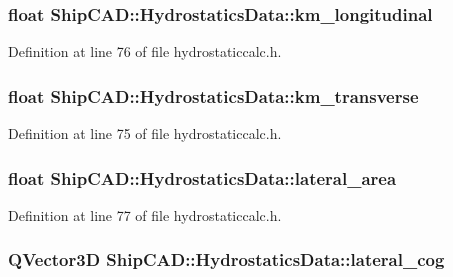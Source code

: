 \hypertarget{structShipCAD_1_1HydrostaticsData_a0a51e62f7d169fa892eaabc6a1937256}{
\subsubsection[{km\-\_\-longitudinal}]{\setlength{\rightskip}{0pt plus 5cm}float Ship\-C\-A\-D\-::\-Hydrostatics\-Data\-::km\-\_\-longitudinal}}\label{structShipCAD_1_1HydrostaticsData_a0a51e62f7d169fa892eaabc6a1937256}


Definition at line 76 of file hydrostaticcalc.\-h.

\hypertarget{structShipCAD_1_1HydrostaticsData_adbadaf4eafa63f1f10778f4c3e1f61a4}{
\subsubsection[{km\-\_\-transverse}]{\setlength{\rightskip}{0pt plus 5cm}float Ship\-C\-A\-D\-::\-Hydrostatics\-Data\-::km\-\_\-transverse}}\label{structShipCAD_1_1HydrostaticsData_adbadaf4eafa63f1f10778f4c3e1f61a4}


Definition at line 75 of file hydrostaticcalc.\-h.

\hypertarget{structShipCAD_1_1HydrostaticsData_a1ba65b28e4351a4d97bc64cd11ddab90}{
\subsubsection[{lateral\-\_\-area}]{\setlength{\rightskip}{0pt plus 5cm}float Ship\-C\-A\-D\-::\-Hydrostatics\-Data\-::lateral\-\_\-area}}\label{structShipCAD_1_1HydrostaticsData_a1ba65b28e4351a4d97bc64cd11ddab90}


Definition at line 77 of file hydrostaticcalc.\-h.

\hypertarget{structShipCAD_1_1HydrostaticsData_adc0c4f2f0c5b110a968e45642dc5eeeb}{
\subsubsection[{lateral\-\_\-cog}]{\setlength{\rightskip}{0pt plus 5cm}Q\-Vector3\-D Ship\-C\-A\-D\-::\-Hydrostatics\-Data\-::lateral\-\_\-cog}}\label{structShipCAD_1_1HydrostaticsData_adc0c4f2f0c5b110a968e45642dc5eeeb}


